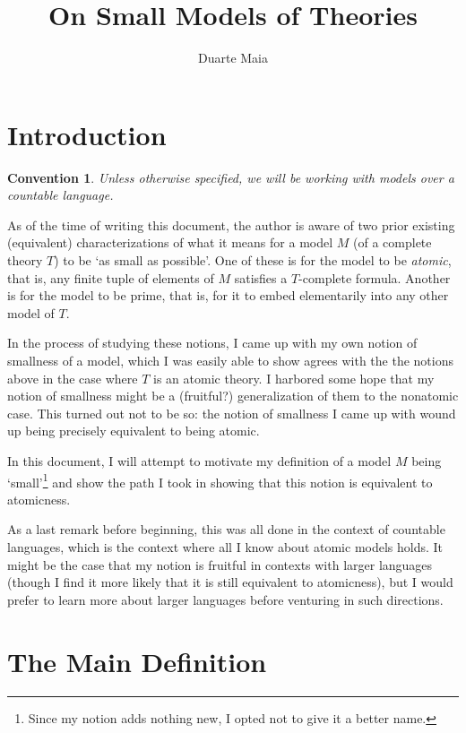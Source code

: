 \documentclass{article}
\title{On Small Models of Theories}
\author{Duarte Maia}
\theoremstyle{nonumberplain}
\newtheorem{convention}{Convention}
\begin{document}
\maketitle

\tableofcontents

\section{Introduction}

\begin{convention}
Unless otherwise specified, we will be working with models over a countable language.
\end{convention}

As of the time of writing this document, the author is aware of two prior existing (equivalent) characterizations of what it means for a model $M$ (of a complete theory $T$) to be `as small as possible'. One of these is for the model to be \emph{atomic}, that is, any finite tuple of elements of $M$ satisfies a $T$-complete formula. Another is for the model to be prime, that is, for it to embed elementarily into any other model of $T$.

In the process of studying these notions, I came up with my own notion of smallness of a model, which I was easily able to show agrees with the the notions above in the case where $T$ is an atomic theory. I harbored some hope that my notion of smallness might be a (fruitful?) generalization of them to the nonatomic case. This turned out not to be so: the notion of smallness I came up with wound up being precisely equivalent to being atomic.

In this document, I will attempt to motivate my definition of a model $M$ being `small'\footnote{Since my notion adds nothing new, I opted not to give it a better name.} and show the path I took in showing that this notion is equivalent to atomicness.

As a last remark before beginning, this was all done in the context of countable languages, which is the context where all I know about atomic models holds. It might be the case that my notion is fruitful in contexts with larger languages (though I find it more likely that it is still equivalent to atomicness), but I would prefer to learn more about larger languages before venturing in such directions.

\section{The Main Definition}
\end{document}
